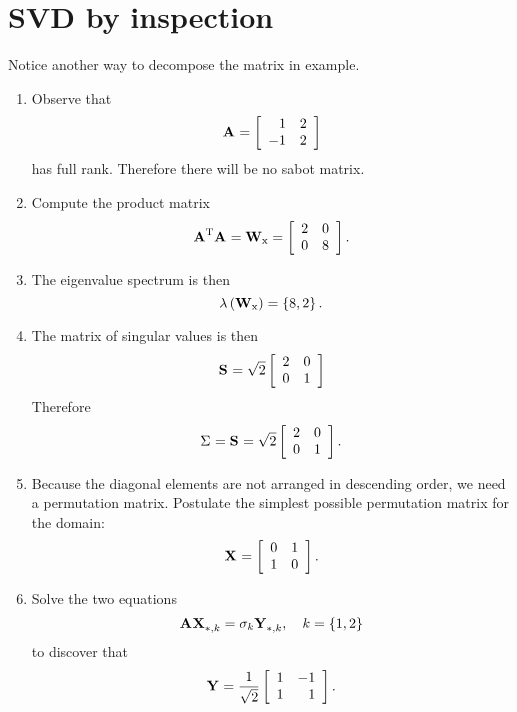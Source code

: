 \section{SVD by inspection}
Notice another way to decompose the matrix in example.
\begin{enumerate}
\item Observe that 
\begin{equation}
  \A{}=\mat{rr}{1&2\\-1&2}
\end{equation}
has full rank. Therefore there will be no sabot matrix.
\item Compute the product matrix
\begin{equation}
  \A{T}\A{} = \W{x} = \mat{cc}{2&0\\0&8}.
\end{equation}
\item The eigenvalue spectrum is then
\begin{equation}
  \lambda\paren{\W{x}} = \lst{8,2}.
\end{equation}
\item The matrix of singular values is then
\begin{equation}
  \ess{} = \sqrt{2}\mat{cc}{2&0\\0&1}
\end{equation}
Therefore
\begin{equation}
  \sig{} = \ess{} = \sqrt{2}\mat{cc}{2&0\\0&1}.
\end{equation}
\item Because the diagonal elements are not arranged in descending order, we need a permutation matrix. Postulate the simplest possible permutation matrix for the domain:
\begin{equation}
  \X{} = \ktwo.
\end{equation}
\item Solve the two equations 
\begin{equation*}
  \A{}\X{}_{*,k} = \sigma_{k} \Y{}_{*,k}, \quad k=\lst{1,2}
\end{equation*}
to discover that
\begin{equation}
  \Y{} = \stwo \mat{rr}{1&-1\\1&1}.
\end{equation}
\end{enumerate}

\endinput